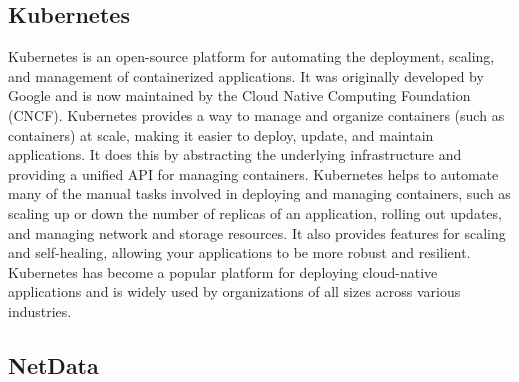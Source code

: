\subsection{Kubernetes}
\label{sec:kubernetes-third-party}
  Kubernetes is an open-source platform for automating the deployment, scaling, and management of containerized applications. It was originally developed by Google and is now maintained by the Cloud Native Computing Foundation (CNCF).
  Kubernetes provides a way to manage and organize containers (such as  containers) at scale, making it easier to deploy, update, and maintain applications. It does this by abstracting the underlying infrastructure and providing a unified API for managing containers.
  Kubernetes helps to automate many of the manual tasks involved in deploying and managing containers, such as scaling up or down the number of replicas of an application, rolling out updates, and managing network and storage resources. It also provides features for scaling and self-healing, allowing your applications to be more robust and resilient.
  Kubernetes has become a popular platform for deploying cloud-native applications and is widely used by organizations of all sizes across various industries.

  \subsection{NetData}
  \label{sec:netdata-third-party}

